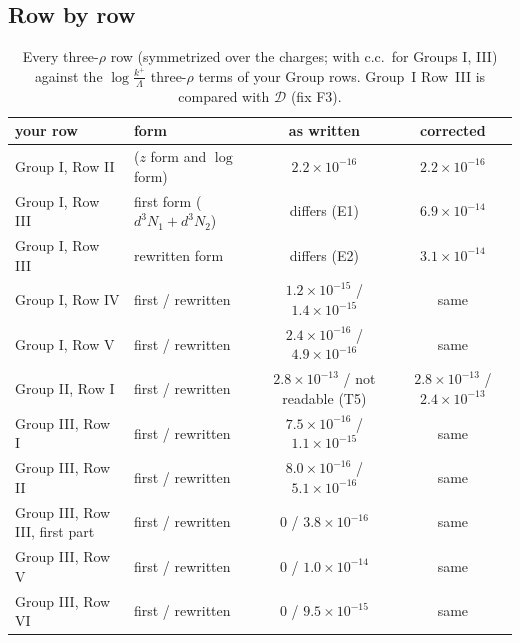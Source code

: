 \documentclass[10pt]{article}
\numberwithin{equation}{section}
\newcommand{\old}[1]{{\color{red}#1}}
\begin{document}
\subsection{Row by row}
\begin{table}[H]\centering\small
\begin{tabular}{llcc}
\toprule
your row & form & as written & corrected\\
\midrule
Group I, Row II & ($z$ form and $\log$ form) & $2.2\times10^{-16}$ & $2.2\times10^{-16}$\\
Group I, Row III & first form ($d^3N_1+d^3N_2$) & \old{differs} (E1) & $6.9\times10^{-14}$\\
Group I, Row III & rewritten form & \old{differs} (E2) & $3.1\times10^{-14}$\\
Group I, Row IV & first / rewritten & $1.2\times10^{-15}$ / $1.4\times10^{-15}$ & same\\
Group I, Row V & first / rewritten & $2.4\times10^{-16}$ / $4.9\times10^{-16}$ & same\\
Group II, Row I & first / rewritten & $2.8\times10^{-13}$ / \old{not readable} (T5) & $2.8\times10^{-13}$ / $2.4\times10^{-13}$\\
Group III, Row I & first / rewritten & $7.5\times10^{-16}$ / $1.1\times10^{-15}$ & same\\
Group III, Row II & first / rewritten & $8.0\times10^{-16}$ / $5.1\times10^{-16}$ & same\\
Group III, Row III, first part & first / rewritten & $0$ / $3.8\times10^{-16}$ & same\\
Group III, Row V & first / rewritten & $0$ / $1.0\times10^{-14}$ & same\\
Group III, Row VI & first / rewritten & $0$ / $9.5\times10^{-15}$ & same\\
\bottomrule
\end{tabular}
\caption{Every three-$\rho$ row (symmetrized over the charges; with c.c.\ for Groups I, III) against the $\log\frac{k^+}{\Lambda}$ three-$\rho$ terms of your Group rows. Group~I Row~III is compared with $\mathcal D$ (fix F3).}\label{tab:three}
\end{table}
\end{document}
